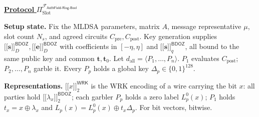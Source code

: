 \documentclass[10pt,letterpaper]{article}
\newcommand{\typedshare}[3]{\mathopen{[\![}#1\mathclose{]\!]}_{#2}^{\mathsf{#3}}}
\newcommand{\sh}[2]{\typedshare{#1}{#2}{BDOZ}}
\newcommand{\ws}[1]{\typedshare{#1}{2}{WRK}}
\newcommand{\vct}[1]{\bm{#1}}
\newcommand{\pre}{C_{\mathrm{pre}}}
\newcommand{\post}{C_{\mathrm{post}}}
\newcommand{\dall}{d_{\mathrm{all}}}
\begin{document}
\begin{mdframed}[style=protocol]
\begin{center}
\underline{\textbf{Protocol }$\Pi_{\mathrm{Slot}}^{\mathcal{F}_{\mathsf{AuthField\text{-}Ring\text{-}Bool}}}$}
\end{center}
\textbf{Setup state.} Fix the MLDSA parameters, matrix $A$, message representative
$\mu$, slot count $N_s$, and agreed circuits $\pre,\post$. Key generation supplies
$\sh{\vct{s}}{D},\sh{\vct{e}}{D}$ with coefficients in $[-\eta,\eta]$ and
$\sh{\vct{s}}{q}$, all bound to the same public key and common $\vct{t},\vct{t}_0$.
Let $\dall=\langle P_1,\ldots,P_n\rangle$. $P_1$ evaluates $\post$; $P_2,\ldots,P_n$
garble it. Every $P_p$ holds a global key $\Delta_p\in\{0,1\}^{128}$.

\textbf{Representations.}
$\ws{x}$ is the WRK encoding of a wire carrying the bit $x$: all parties hold
$\sh{\lambda_x}{2}$; each garbler $P_p$ holds a zero label $L_p^0(x)$;
$P_1$ holds $t_x=x\oplus\lambda_x$ and $L_p(x)=L_p^0(x)\oplus t_x\Delta_p$.
For bit vectors, bitwise.


\end{mdframed}
\end{document}

